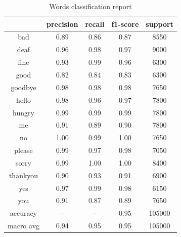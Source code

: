\begin{table}[h]
	\centering
	\begin{tabular}{|c|c|c|c|c|}
		\hline
		& precision & recall & f1-score & support \\
		\hline
		bad & 0.89 & 0.86 & 0.87 & 8550 \\
		\hline
		deaf & 0.96 & 0.98 & 0.97 & 9000 \\
		\hline
		fine & 0.93 & 0.99 & 0.96 & 6300 \\
		\hline
		good & 0.82 & 0.84 & 0.83 & 6300 \\
		\hline
		goodbye & 0.98 & 0.98 & 0.98 & 7650 \\
		\hline
		hello & 0.98 & 0.96 & 0.97 & 7800 \\
		\hline
		hungry & 0.99 & 0.99 & 0.99 & 7800 \\
		\hline
		me & 0.91 & 0.89 & 0.90 & 7800 \\
		\hline
		no & 1.00 & 0.99 & 1.00 & 7650 \\
		\hline
		please & 0.99 & 0.97 & 0.98 & 7050 \\
		\hline
		sorry & 0.99 & 1.00 & 1.00 & 8400 \\
		\hline
		thankyou & 0.90 & 0.93 & 0.91 & 6900 \\
		\hline
		yes & 0.97 & 0.99 & 0.98 & 6150 \\
		\hline
		you & 0.91 & 0.87 & 0.89 & 7650 \\
		\hline
		accuracy & - & - & 0.95 & 105000 \\
		\hline
		macro avg & 0.94 & 0.95 & 0.95 & 105000 \\
		\hline
	\end{tabular}
	\caption{Words classification report}
	\label{tab:words_classification_report}
\end{table}
